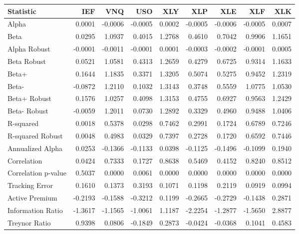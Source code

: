 \begin{tabular}{lrrrrrrrr}
\toprule
Statistic & IEF & VNQ & USO & XLY & XLP & XLE & XLF & XLK \\
\midrule
Alpha & 0.0001 & -0.0006 & -0.0005 & 0.0002 & -0.0005 & -0.0006 & -0.0005 & 0.0007 \\
Beta & 0.0295 & 1.0937 & 0.4015 & 1.2768 & 0.4610 & 0.7042 & 0.9906 & 1.1651 \\
Alpha Robust & -0.0001 & -0.0011 & -0.0001 & 0.0001 & -0.0003 & -0.0002 & -0.0001 & 0.0005 \\
Beta Robust & 0.0521 & 1.0581 & 0.4313 & 1.2659 & 0.4279 & 0.6725 & 0.9314 & 1.1633 \\
Beta+ & 0.1644 & 1.1835 & 0.3371 & 1.3205 & 0.5074 & 0.5275 & 0.9452 & 1.2319 \\
Beta- & -0.0872 & 1.2110 & 0.1032 & 1.3143 & 0.3748 & 0.5559 & 1.0775 & 1.0530 \\
Beta+ Robust & 0.1576 & 1.0257 & 0.4098 & 1.3153 & 0.4755 & 0.6927 & 0.9563 & 1.2429 \\
Beta- Robust & -0.0059 & 1.2011 & 0.0730 & 1.2892 & 0.3329 & 0.4960 & 0.9488 & 1.0406 \\
R-squared & 0.0018 & 0.5378 & 0.0298 & 0.7462 & 0.2991 & 0.1724 & 0.6789 & 0.7246 \\
R-squared Robust & 0.0048 & 0.4983 & 0.0329 & 0.7397 & 0.2728 & 0.1720 & 0.6592 & 0.7446 \\
Annualized Alpha & 0.0253 & -0.1366 & -0.1133 & 0.0398 & -0.1125 & -0.1496 & -0.1099 & 0.1940 \\
Correlation & 0.0424 & 0.7333 & 0.1727 & 0.8638 & 0.5469 & 0.4152 & 0.8240 & 0.8512 \\
Correlation p-value & 0.5037 & 0.0000 & 0.0061 & 0.0000 & 0.0000 & 0.0000 & 0.0000 & 0.0000 \\
Tracking Error & 0.1610 & 0.1373 & 0.3193 & 0.1071 & 0.1198 & 0.2119 & 0.0919 & 0.0994 \\
Active Premium & -0.2193 & -0.1588 & -0.3212 & 0.1199 & -0.2665 & -0.2729 & -0.1438 & 0.2871 \\
Information Ratio & -1.3617 & -1.1565 & -1.0061 & 1.1187 & -2.2254 & -1.2877 & -1.5650 & 2.8877 \\
Treynor Ratio & 0.9398 & 0.0806 & -0.1849 & 0.2873 & -0.0424 & -0.0368 & 0.1041 & 0.4583 \\
\bottomrule
\end{tabular}
